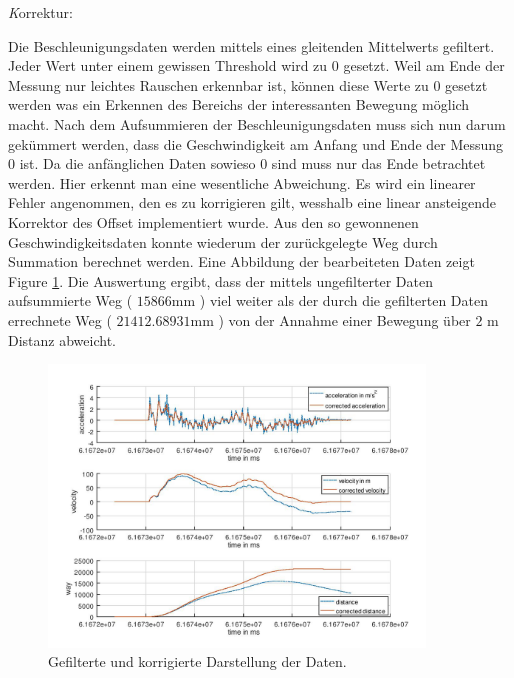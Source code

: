\documentclass[12pt]{article}
\begin{document}
\textit Korrektur:

Die Beschleunigungsdaten werden mittels eines gleitenden Mittelwerts gefiltert. Jeder Wert unter einem gewissen Threshold wird zu 0 gesetzt. Weil am Ende der Messung nur leichtes Rauschen erkennbar ist, können diese Werte zu 0 gesetzt werden was ein Erkennen des Bereichs der interessanten Bewegung möglich macht. 
Nach dem Aufsummieren der Beschleunigungsdaten muss sich nun darum gekümmert werden, dass die Geschwindigkeit am Anfang und Ende der Messung 0 ist. Da die anfänglichen Daten sowieso 0 sind muss nur das Ende betrachtet werden. Hier erkennt man eine wesentliche Abweichung. Es wird ein linearer Fehler angenommen, den es zu korrigieren gilt, wesshalb eine linear ansteigende Korrektor des Offset implementiert wurde. 
Aus den so gewonnenen Geschwindigkeitsdaten konnte wiederum der zurückgelegte Weg durch Summation berechnet werden.
Eine Abbildung der bearbeiteten Daten zeigt Figure \ref{fig:filteredData}. Die Auswertung ergibt, dass der mittels ungefilterter Daten aufsummierte Weg ( $ 15866$mm ) viel weiter als der durch die gefilterten Daten errechnete Weg ( $21412.68931$mm ) von der Annahme einer Bewegung über $2$ m Distanz abweicht.

\begin{figure}[H]
	\centering
	\includegraphics[width=10cm]{images/filteredData.jpg}
	\caption{Gefilterte und korrigierte Darstellung der Daten.}
	\label{fig:filteredData}
\end{figure}


\newpage

\end{document}
